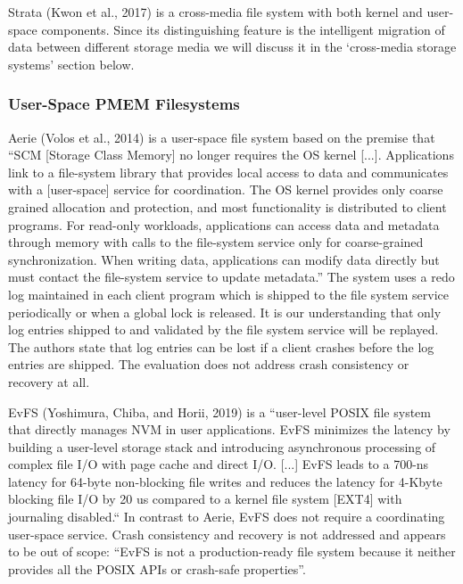 \documentclass[12pt,a4paper,twoside,draft]{book}
\begin{document}
Strata (Kwon et al., 2017) is a cross-media file system with both kernel and user-space components. Since its distinguishing feature is the intelligent migration of data between different storage media we will discuss it in the ‘cross-media storage systems’ section below.

\subsubsection{User-Space PMEM Filesystems}
\blindtext{}

Aerie (Volos et al., 2014) is a user-space file system based on the premise that “SCM [Storage Class Memory] no longer requires the OS kernel [...]. Applications link to a file-system library that provides local access to data and communicates with a [user-space] service for coordination. The OS kernel provides only coarse grained allocation and protection, and most functionality is distributed to client programs. For read-only workloads, applications can access data and metadata through memory with calls to the file-system service only for coarse-grained synchronization. When writing data, applications can modify data directly but must contact the file-system service to update metadata.”
The system uses a redo log maintained in each client program which is shipped to the file system service periodically or when a global lock is released. It is our understanding that only log entries shipped to and validated by the file system service will be replayed. The authors state that log entries can be lost if a client crashes before the log entries are shipped. The evaluation does not address crash consistency or recovery at all.

EvFS (Yoshimura, Chiba, and Horii, 2019) is a  “user-level POSIX file system that directly manages NVM in user applications. EvFS minimizes the latency by building a user-level storage stack and introducing asynchronous processing of complex file I/O with page cache and direct I/O. [...] EvFS leads to a 700-ns latency for 64-byte non-blocking file writes and reduces the latency for 4-Kbyte blocking file I/O by 20 us compared to a kernel file system [EXT4] with journaling disabled.“
In contrast to Aerie, EvFS does not require a coordinating user-space service. Crash consistency and recovery is not addressed and appears to be out of scope: “EvFS is not a production-ready file system because it neither provides all the POSIX APIs or crash-safe properties”.
\end{document}
